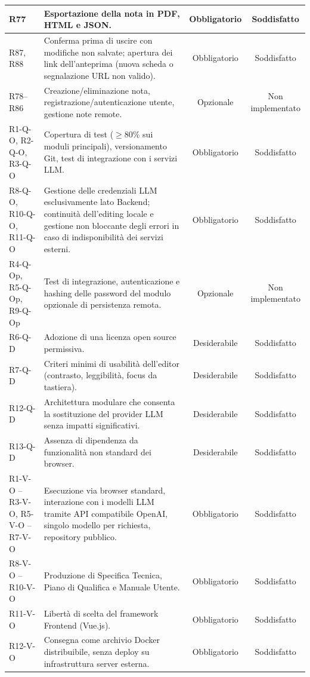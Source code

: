 \begin{xltabular}{\textwidth}{|>{\centering\arraybackslash}p{2.6cm}|X|c|c|}
	R77 & Esportazione della nota in PDF, HTML e JSON. & Obbligatorio & Soddisfatto \\ \hline
	R87, R88 & Conferma prima di uscire con modifiche non salvate; apertura dei link dell'anteprima (nuova scheda o segnalazione URL non valido). & Obbligatorio & Soddisfatto \\ \hline
	R78--R86 & Creazione/eliminazione nota, registrazione/autenticazione utente, gestione note remote. & Opzionale & Non implementato \\ \hline
	R1-Q-O, R2-Q-O, R3-Q-O & Copertura di test ($\geq$80\% sui moduli principali), versionamento Git, test di integrazione con i servizi LLM. & Obbligatorio & Soddisfatto \\ \hline
	R8-Q-O, R10-Q-O, R11-Q-O & Gestione delle credenziali LLM esclusivamente lato Backend; continuità dell'editing locale e gestione non bloccante degli errori in caso di indisponibilità dei servizi esterni. & Obbligatorio & Soddisfatto \\ \hline
	R4-Q-Op, R5-Q-Op, R9-Q-Op & Test di integrazione, autenticazione e hashing delle password del modulo opzionale di persistenza remota. & Opzionale & Non implementato \\ \hline
	R6-Q-D & Adozione di una licenza open source permissiva. & Desiderabile & Soddisfatto \\ \hline
	R7-Q-D & Criteri minimi di usabilità dell'editor (contrasto, leggibilità, focus da tastiera). & Desiderabile & Soddisfatto \\ \hline
	R12-Q-D & Architettura modulare che consenta la sostituzione del provider LLM senza impatti significativi. & Desiderabile & Soddisfatto \\ \hline
	R13-Q-D & Assenza di dipendenza da funzionalità non standard dei browser. & Desiderabile & Soddisfatto \\ \hline
	R1-V-O -- R3-V-O, R5-V-O -- R7-V-O & Esecuzione via browser standard, interazione con i modelli LLM tramite API compatibile OpenAI, singolo modello per richiesta, repository pubblico. & Obbligatorio & Soddisfatto \\ \hline
	R8-V-O -- R10-V-O & Produzione di Specifica Tecnica, Piano di Qualifica e Manuale Utente. & Obbligatorio & Soddisfatto \\ \hline
	R11-V-O & Libertà di scelta del framework Frontend (Vue.js). & Obbligatorio & Soddisfatto \\ \hline
	R12-V-O & Consegna come archivio Docker distribuibile, senza deploy su infrastruttura server esterna. & Obbligatorio & Soddisfatto \\ \hline

\end{xltabular}
